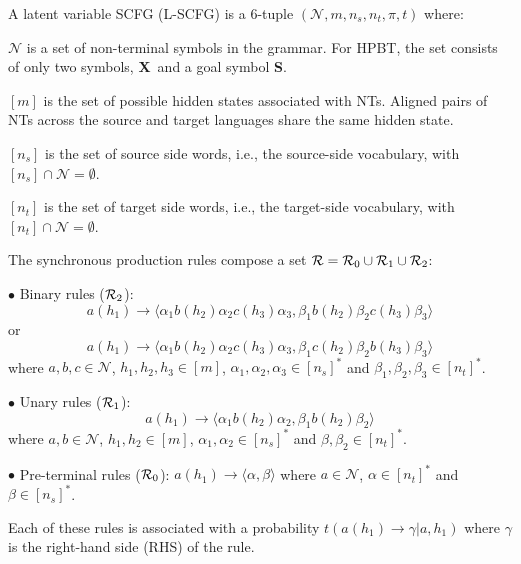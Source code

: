 \documentclass[11pt]{article}
\newcommand{\rules}{{\cal R}}
\newcommand{\bS}{{\bf S}}
\newcommand{\bX}{{\bf X}}
\newenvironment{itemizesquish}{\begin{list}{\setcounter{enumi}{0}\labelitemi}{\setlength{\itemsep}{-0.25em}\setlength{\labelwidth}{0.5em}\setlength{\leftmargin}{\labelwidth}\addtolength{\leftmargin}{\labelsep}}}{\end{list}}
\begin{document}
A latent variable SCFG (L-SCFG) is a 6-tuple $(\mathcal{N}, m, n_s, n_t, \pi, t)$ where: 
\begin{itemizesquish}
  \item $\mathcal{N}$ is a set of non-terminal symbols in the grammar.  
  	For HPBT, the set consists of only two symbols, \bX~and a goal symbol \bS.  
  \item $[m]$ is the set of possible hidden states associated with NTs.  
  	Aligned pairs of NTs across the source and target languages share the same hidden state.
   \item $[n_s]$ is the set of source side words, i.e., the source-side vocabulary, with $[n_s] \cap \mathcal{N} = \emptyset$.
   \item $[n_t]$ is the set of target side words, i.e., the target-side vocabulary, with $[n_t] \cap \mathcal{N} = \emptyset$.
   \item The synchronous production rules compose a set $\rules = \rules_0 \cup \rules_1 \cup \rules_2$:
   
$\bullet$ Binary rules ($\rules_2$): $$a(h_1) \rightarrow \langle \alpha_1 b(h_2) \alpha_2 c(h_3) \alpha_3, \beta_1 b(h_2) \beta_2 c(h_3) \beta_3 \rangle$$ or $$a(h_1) \rightarrow \langle \alpha_1 b(h_2) \alpha_2 c(h_3) \alpha_3, \beta_1 c(h_2) \beta_2 b(h_3) \beta_3 \rangle$$ where $a,b,c \in \mathcal{N}$, $h_1,h_2,h_3 \in [m]$, $\alpha_1,\alpha_2,\alpha_3 \in [n_s]^{\ast}$ and $\beta_1,\beta_2,\beta_3 \in [n_t]^{\ast}$.

$\bullet$ Unary rules ($\rules_1$): $$a(h_1) \rightarrow \langle \alpha_1 b(h_2) \alpha_2, \beta_1 b(h_2) \beta_2\rangle$$ where $a,b \in \mathcal{N}$, $h_1,h_2 \in [m]$, $\alpha_1,\alpha_2 \in [n_s]^{\ast}$ and $\beta,\beta_2 \in [n_t]^{\ast}$. 

$\bullet$ Pre-terminal rules ($\rules_0$): $a(h_1) \rightarrow \langle \alpha, \beta \rangle$ where $a \in \mathcal{N}$, $\alpha \in [n_t]^{\ast}$ and $\beta \in [n_s]^{\ast}$.

Each of these rules is associated with a probability $t(a(h_1) \rightarrow \gamma | a, h_1)$ where $\gamma$ is the right-hand side (RHS) of the rule.


\end{itemizesquish}
\end{document}
